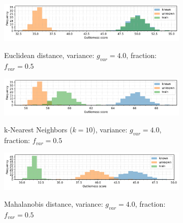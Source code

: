 \begin{figure}[t]
    \centering
    \begin{subfigure}[b]{\textwidth}
        \centering
        \caption{\small Euclidean distance, variance: $g_{var} = 4.0$, fraction: $f_{var} = 0.5$}
        \includegraphics[width=\textwidth]{images/variances/hists-extreme/hist-variances-n_varied_0.50-variance_4.00-distance_16-outliers_varied_False-model_ED-seed_0.pdf}
        \label{fig:hists-variances-extreme-ed}
    \end{subfigure}
    \begin{subfigure}[b]{\textwidth}
        \centering
        \caption{\small k-Nearest Neighbors ($k=10$), variance: $g_{var} = 4.0$, fraction: $f_{var} = 0.5$}
        \includegraphics[width=\textwidth]{images/variances/hists-extreme/hist-variances-n_varied_0.50-variance_4.00-distance_16-outliers_varied_False-model_kNN-10-seed_0.pdf}
        \label{fig:hists-variances-extreme-knn}
    \end{subfigure}
    \begin{subfigure}[b]{\textwidth}
        \centering
        \caption{\small Mahalanobis distance, variance: $g_{var} = 4.0$, fraction: $f_{var} = 0.5$}
        \includegraphics[width=\textwidth]{images/variances/hists-extreme/hist-variances-n_varied_0.50-variance_4.00-distance_16-outliers_varied_False-model_MD-seed_0.pdf}
        \label{fig:hists-variances-extreme-md}
    \end{subfigure}
    \begin{subfigure}[b]{\textwidth}
        \centering

\end{subfigure}
\end{figure}
